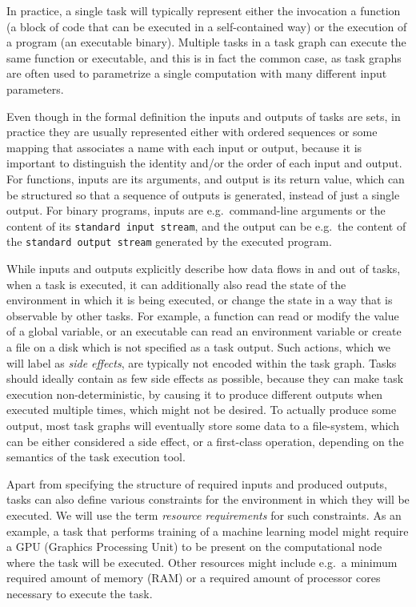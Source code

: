 In practice, a single task will typically represent either the invocation a function (a block of
code that can be executed in a self-contained way) or the execution of a program (an executable
binary). Multiple tasks in a task graph can execute the same function or executable, and this is in
fact the common case, as task graphs are often used to parametrize a single computation with many
different input parameters.

Even though in the formal definition the inputs and outputs of tasks are sets, in practice they are
usually represented either with ordered sequences or some mapping that associates a name with each
input or output, because it is important to distinguish the identity and/or the order of each input
and output. For functions, inputs are its arguments, and output is its return value, which can be
structured so that a sequence of outputs is generated, instead of just a single output. For binary
programs, inputs are e.g.\ command-line arguments or the content of its \texttt{standard input stream}, and
the output can be e.g.\ the content of the \texttt{standard output stream} generated by the executed
program.

While inputs and outputs explicitly describe how data flows in and out of tasks, when a task is
executed, it can additionally also read the state of the environment in which it is being executed,
or change the state in a way that is observable by other tasks. For example, a function can read or
modify the value of a global variable, or an executable can read an environment variable or create
a file on a disk which is not specified as a task output. Such actions, which we will label as
\emph{side effects}, are typically not encoded within the task graph. Tasks should ideally
contain as few side effects as possible, because they can make task execution non-deterministic, by
causing it to produce different outputs when executed multiple times, which might not be desired.
To actually produce some output, most task graphs will eventually store some data to a file-system,
which can be either considered a side effect, or a first-class operation, depending on the
semantics of the task execution tool.

Apart from specifying the structure of required inputs and produced outputs, tasks can also define
various constraints for the environment in which they will be executed. We will use the term
\emph{resource requirements} for such constraints. As an example, a task that performs training of a
machine learning model might require a GPU (Graphics Processing Unit) to be present on the
computational node where the task will be executed. Other resources might include e.g.\ a minimum
required amount of memory (RAM) or a required amount of processor cores necessary to execute the
task.

